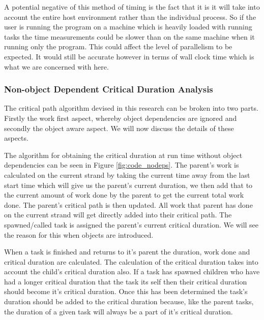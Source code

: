 A potential negative of this method of timing is the fact that it is it will take into account the entire host environment rather than the individual process. So if the user is running the program on a machine which is heavily loaded with running tasks the time measurements could be slower than on the same machine when it running only the program. This could affect the level of parallelism to be expected. It would still be accurate however in terms of wall clock time which is what we are concerned with here.

\subsubsection{Non-object Dependent Critical Duration Analysis}

The critical path algorithm devised in this research can be broken into two parts. Firstly the work first aspect, whereby object dependencies are ignored and secondly the object aware aspect. We will now discuss the details of these aspects.

The algorithm for obtaining the critical duration at run time without object dependencies can be seen in Figure \ref{fig:code_nodeps}. The parent's work is calculated on the current strand by taking the current time away from the last start time which will give us the parent's current duration, we then add that to the current amount of work done by the parent to get the current total work done. The parent's critical path is then updated. All work that parent has done on the current strand will get directly added into their critical path. The spawned/called task is assigned the parent's current critical duration. We will see the reason for this when objects are introduced.

When a task is finished and returns to it's parent the duration, work done and critical duration are calculated. The calculation of the critical duration takes into account the child's critical duration also. If a task has spawned children who have had a longer critical duration that the task its self then their critical duration should become it's critical duration. Once this has been determined the task's duration should be added to the critical duration because, like the parent tasks, the duration of a given task will always be a part of it's critical duration. 


